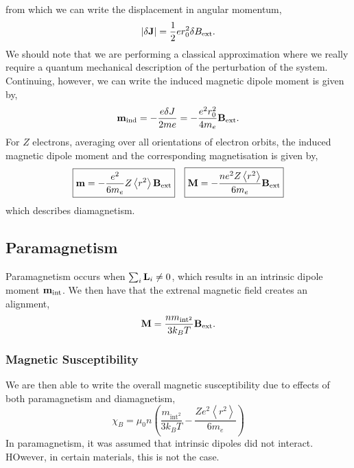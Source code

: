 \documentclass{book}
\begin{document}
from which we can write the displacement in angular momentum,
\begin{equation}
	|\delta \vb{J}| = \frac{1}{2}er_0^2\delta B_{\text{ext}}.
\end{equation}
We should note that we are performing a classical approximation where we really require a quantum mechanical description of the perturbation of the system. Continuing, however, we can write the induced magnetic dipole moment is given by,
\begin{equation}
	\vb{m}_{\text{ind}} = -\frac{e\delta J}{2me} = -\frac{e^2r_0^2}{4m_e}\vb{B}_{\text{ext}}.
\end{equation}
For $Z$ electrons, averaging over all orientations of electron orbits, the induced magnetic dipole moment and the corresponding magnetisation is given by,
\begin{align}
	\boxed{\vb{m} = -\frac{e^2}{6m_e}Z\left<r^2\right>\vb{B}_{\text{ext}}} && \boxed{\vb{M} = -\frac{ne^2Z\left<r^2\right>}{6m_e}\vb{B}_{\text{ext}}}
\end{align}
which describes diamagnetism.
\subsection{Paramagnetism}
Paramagnetism occurs when $\sum_i\vb{L}_i \neq 0$, which results in an intrinsic dipole moment $\vb{m}_\text{int}$. We then have that the extrenal magnetic field creates an alignment,
\begin{equation}
	\vb{M} = \frac{nm_{\text{int}^2}}{3k_B T}\vb{B}_{\text{ext}}.
\end{equation}
\subsubsection{Magnetic Susceptibility}
We are then able to write the overall magnetic susceptibility due to effects of both paramagnetism and diamagnetism,
\begin{equation}
	\boxed{\chi_B = \mu_0n\left(\frac{m_{\text{int}^2}}{3k_BT} - \frac{Ze^2\left<r^2\right>}{6m_e}\right)}
\end{equation}
In paramagnetism, it was assumed that intrinsic dipoles did not interact. HOwever, in certain materials, this is not the case.
\end{document}
